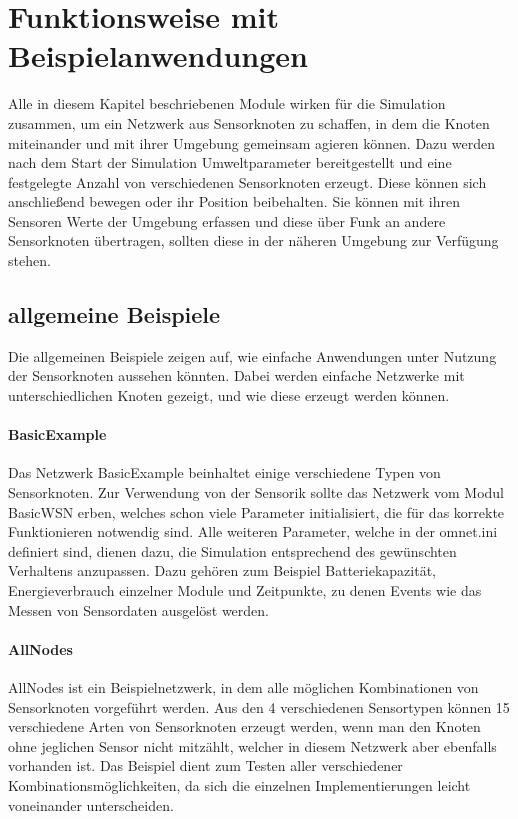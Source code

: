\section{Funktionsweise mit Beispielanwendungen}

Alle in diesem Kapitel beschriebenen Module wirken für die Simulation zusammen, um ein Netzwerk aus Sensorknoten zu schaffen, in dem die Knoten miteinander und mit ihrer Umgebung gemeinsam agieren können. Dazu werden nach dem Start der Simulation Umweltparameter bereitgestellt und eine festgelegte Anzahl von verschiedenen Sensorknoten erzeugt. Diese können sich anschließend bewegen oder ihr Position beibehalten. Sie können mit ihren Sensoren Werte der Umgebung erfassen und diese über Funk an andere Sensorknoten übertragen, sollten diese in der näheren Umgebung zur Verfügung stehen.

\subsection*{allgemeine Beispiele}

Die allgemeinen Beispiele zeigen auf, wie einfache Anwendungen unter Nutzung der Sensorknoten aussehen könnten. Dabei werden einfache Netzwerke mit unterschiedlichen Knoten gezeigt, und wie diese erzeugt werden können.

\paragraph{BasicExample}

Das Netzwerk BasicExample beinhaltet einige verschiedene Typen von Sensorknoten. Zur Verwendung von der Sensorik sollte das Netzwerk vom Modul BasicWSN erben, welches schon viele Parameter initialisiert, die für das korrekte Funktionieren notwendig sind. Alle weiteren Parameter, welche in der omnet.ini definiert sind, dienen dazu, die Simulation entsprechend des gewünschten Verhaltens anzupassen. Dazu gehören zum Beispiel Batteriekapazität, Energieverbrauch einzelner Module und Zeitpunkte, zu denen Events wie das Messen von Sensordaten ausgelöst werden.

\paragraph{AllNodes}

AllNodes ist ein Beispielnetzwerk, in dem alle möglichen Kombinationen von Sensorknoten vorgeführt werden. Aus den 4 verschiedenen Sensortypen können 15 verschiedene Arten von Sensorknoten erzeugt werden, wenn man den Knoten ohne jeglichen Sensor nicht mitzählt, welcher in diesem Netzwerk aber ebenfalls vorhanden ist. Das Beispiel dient zum Testen aller verschiedener Kombinationsmöglichkeiten, da sich die einzelnen Implementierungen leicht voneinander unterscheiden.

